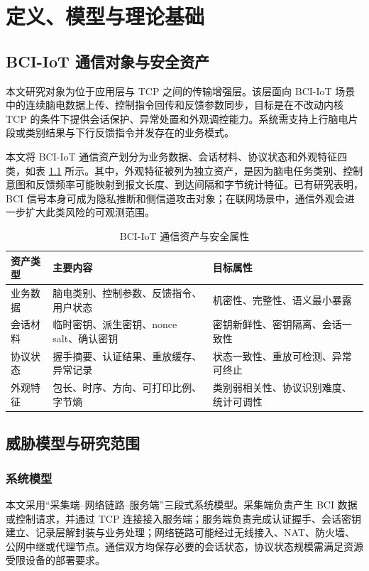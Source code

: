 \chapter{定义、模型与理论基础}

\section{BCI-IoT 通信对象与安全资产}
本文研究对象为位于应用层与 TCP 之间的传输增强层。该层面向 BCI-IoT 场景中的连续脑电数据上传、控制指令回传和反馈参数同步，目标是在不改动内核 TCP 的条件下提供会话保护、异常处置和外观调控能力。系统需支持上行脑电片段或类别结果与下行反馈指令并发存在的业务模式。

本文将 BCI-IoT 通信资产划分为业务数据、会话材料、协议状态和外观特征四类，如表 \ref{tab:c2-assets} 所示。其中，外观特征被列为独立资产，是因为脑电任务类别、控制意图和反馈频率可能映射到报文长度、到达间隔和字节统计特征。已有研究表明，BCI 信号本身可成为隐私推断和侧信道攻击对象\cite{martinovic2012sidechannel,lange2018pinbci}；在联网场景中，通信外观会进一步扩大此类风险的可观测范围。

\begin{table}[H]
\centering
\small
\caption{BCI-IoT 通信资产与安全属性}
\label{tab:c2-assets}
\begin{tabular}{p{2.5cm}p{5.0cm}p{5.2cm}}
\toprule
资产类型 & 主要内容 & 目标属性 \\
\midrule
业务数据 & 脑电类别、控制参数、反馈指令、用户状态 & 机密性、完整性、语义最小暴露 \\
\midrule
会话材料 & 临时密钥、派生密钥、nonce salt、确认密钥 & 密钥新鲜性、密钥隔离、会话一致性 \\
\midrule
协议状态 & 握手摘要、认证结果、重放缓存、异常记录 & 状态一致性、重放可检测、异常可终止 \\
\midrule
外观特征 & 包长、时序、方向、可打印比例、字节熵 & 类别弱相关性、协议识别难度、统计可调性 \\
\bottomrule
\end{tabular}
\end{table}

\section{威胁模型与研究范围}
\subsection{系统模型}
本文采用“采集端--网络链路--服务端”三段式系统模型。采集端负责产生 BCI 数据或控制请求，并通过 TCP 连接接入服务端；服务端负责完成认证握手、会话密钥建立、记录层解封装与业务处理；网络链路可能经过无线接入、NAT、防火墙、公网中继或代理节点。通信双方均保存必要的会话状态，协议状态规模需满足资源受限设备的部署要求。

